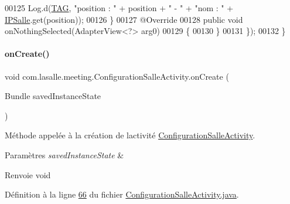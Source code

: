 \begin{DoxyCode}
00125                 Log.d(\hyperlink{classcom_1_1lasalle_1_1meeting_1_1_configuration_salle_activity_a55224a88c619aa44eb96c0febc3f1857}{TAG}, \textcolor{stringliteral}{"position : "} + position + \textcolor{stringliteral}{" - "} + \textcolor{stringliteral}{"nom : "} + 
      \hyperlink{classcom_1_1lasalle_1_1meeting_1_1_configuration_salle_activity_a74bb868ae39746bae6533c1735207abf}{IPSalle}.get(position));
00126             \}
00127             @Override
00128             \textcolor{keyword}{public} \textcolor{keywordtype}{void} onNothingSelected(AdapterView<?> arg0)
00129             \{
00130             \}
00131         \});
00132     \}
\end{DoxyCode}
\mbox{\label{classcom_1_1lasalle_1_1meeting_1_1_configuration_salle_activity_a202931e45bdc0f81c3f0518a6b28e712}} 
\paragraph{\texorpdfstring{on\+Create()}{onCreate()}}
{\footnotesize\ttfamily void com.\+lasalle.\+meeting.\+Configuration\+Salle\+Activity.\+on\+Create (\begin{DoxyParamCaption}\item[{Bundle}]{saved\+Instance\+State }\end{DoxyParamCaption})\hspace{0.3cm}{\ttfamily [protected]}}



Méthode appelée à la création de l\textquotesingle{}activité \hyperlink{classcom_1_1lasalle_1_1meeting_1_1_configuration_salle_activity}{Configuration\+Salle\+Activity}. 


\begin{DoxyParams}{Paramètres}
{\em saved\+Instance\+State} & \\
\hline
\end{DoxyParams}
\begin{DoxyReturn}{Renvoie}
void 
\end{DoxyReturn}


Définition à la ligne \hyperlink{_configuration_salle_activity_8java_source_l00066}{66} du fichier \hyperlink{_configuration_salle_activity_8java_source}{Configuration\+Salle\+Activity.\+java}.



